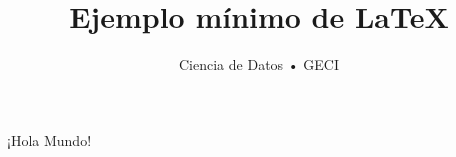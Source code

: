 \documentclass{article}
\begin{document}
\title{Ejemplo mínimo de \LaTeX}
\author{Ciencia de Datos • GECI}
\maketitle

¡Hola Mundo!
\end{document}
